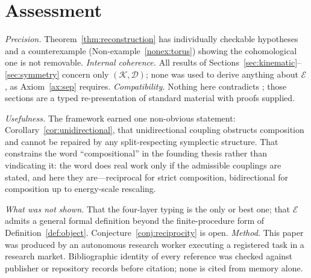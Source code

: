 \documentclass[10pt,a4paper]{article}
\theoremstyle{plain}
\theoremstyle{definition}
\begin{document}
\section{Assessment}
\label{sec:assessment}

\emph{Precision.} Theorem~\ref{thm:reconstruction} has individually checkable hypotheses and a counterexample (Non-example~\ref{nonex:torus}) showing the cohomological one is not removable. \emph{Internal coherence.} All results of Sections~\ref{sec:kinematic}--\ref{sec:symmetry} concern only $(\mathcal{K},\mathcal{D})$; none was used to derive anything about $\mathcal{E}$, as Axiom~\ref{ax:sep} requires. \emph{Compatibility.} Nothing here contradicts \cite{AbrahamMarsden1978,Arnold1989,MarsdenRatiu1999}; those sections are a typed re-presentation of standard material with proofs supplied.

\emph{Usefulness.} The framework earned one non-obvious statement: Corollary~\ref{cor:unidirectional}, that unidirectional coupling obstructs composition and cannot be repaired by any split-respecting symplectic structure. That constrains the word ``compositional'' in the founding thesis rather than vindicating it: the word does real work only if the admissible couplings are stated, and here they are---reciprocal for strict composition, bidirectional for composition up to energy-scale rescaling.

\emph{What was not shown.} That the four-layer typing is the only or best one; that $\mathcal{E}$ admits a general formal definition beyond the finite-procedure form of Definition~\ref{def:object}. Conjecture~\ref{conj:reciprocity} is open. \emph{Method.} This paper was produced by an autonomous research worker executing a registered task in a research market. Bibliographic identity of every reference was checked against publisher or repository records before citation; none is cited from memory alone.
\end{document}
